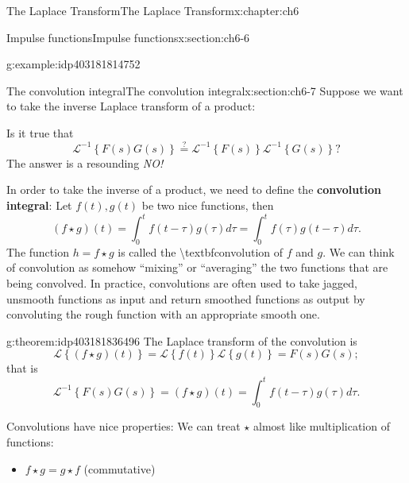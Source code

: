 \documentclass[oneside,10pt,]{book}
\newcommand{\terminology}[1]{\textbf{#1}}
\numberwithin{equation}{section}
\numberwithin{equation}{section}
\begin{document}
\begin{chapterptx}{The Laplace Transform}{}{The Laplace Transform}{}{}{x:chapter:ch6}
\begin{sectionptx}{Impulse functions}{}{Impulse functions}{}{}{x:section:ch6-6}
\begin{example}{}{g:example:idp403181814752}
\end{example}
\end{sectionptx}
%
%
\typeout{************************************************}
\typeout{************************************************}
%
\begin{sectionptx}{The convolution integral}{}{The convolution integral}{}{}{x:section:ch6-7}
Suppose we want to take the inverse Laplace transform of a product:%
\par
Is it true that%
\begin{equation*}
\mathcal{L}^{-1}\left\{ F(s)G(s)\right\} \overset{?}{=}\mathcal{L}^{-1}\left\{ F(s)\right\} \mathcal{L}^{-1}\left\{ G(s)\right\}?
\end{equation*}
The answer is a resounding \emph{NO!}%
\par
In order to take the inverse of a product, we need to define the \terminology{convolution integral}: Let \(f(t),g(t)\) be two nice functions, then%
\begin{equation*}
\left(f\star g\right)(t)=\int_{0}^{t}f\left(t-\tau\right)g\left(\tau\right)d\tau=\int_{0}^{t}f(\tau)g\left(t-\tau\right)d\tau.
\end{equation*}
The function \(h=f\star g\) is called the \textbackslash{}textbf\textbraceleft{}convolution\textbraceright{} of \(f\) and \(g\). We can think of convolution as somehow ``mixing'' or ``averaging'' the two functions that are being convolved. In practice, convolutions are often used to take jagged, unsmooth functions as input and return smoothed functions as output by convoluting the rough function with an appropriate smooth one.%
\begin{theorem}{}{}{g:theorem:idp403181836496}%
The Laplace transform of the convolution is%
\begin{equation*}
\mathcal{L}\left\{ \left(f\star g\right)(t)\right\} =\mathcal{L}\left\{ f(t)\right\} \mathcal{L}\left\{ g(t)\right\} =F(s)G(s);
\end{equation*}
that is%
\begin{equation*}
\mathcal{L}^{-1}\left\{ F(s)G(s)\right\} =\left(f\star g\right)(t)=\int_{0}^{t}f\left(t-\tau\right)g\left(\tau\right)d\tau.
\end{equation*}
%
\end{theorem}
Convolutions have nice properties: We can treat \(\star\) almost like multiplication of functions:%
\begin{itemize}[label=\textbullet]
\item{}\(f\star g=g\star f\) (commutative)%

\end{itemize}
\end{sectionptx}
\end{chapterptx}
\end{document}
